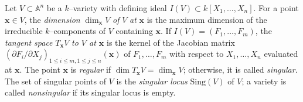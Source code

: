 \documentclass[pdflatex,sn-basic]{sn-jnl}%
\theoremstyle{thmstyleone}%
\theoremstyle{thmstyletwo}%
\theoremstyle{thmstylethree}%
\theoremstyle{definition}
\numberwithin{equation}{section}
\newcommand{\bfs}{\boldsymbol}
\newcommand{\A}{\mathbb A}
\newcommand{\Pp}{\mathbb P}
\begin{document}
%
%

Let $V\subset\A^n$ be a $k$--variety with defining ideal $I(V)\subset k[X_1,\ldots,
X_n]$. For a point $\bfs x\in V$, the {\em
dimension} $\dim_{\bfs x}V$ {\em of} $V$ {\em at} $\bfs x$ is the maximum
dimension of the irreducible $k$--components of $V$ containing
$\bfs x$. If $I(V)=(F_1,\ldots, F_m)$, the {\em tangent space} $T_{\bfs x}V$
{\em to $V$ at $\bfs x$} is the kernel of the Jacobian matrix $(\partial
F_i/\partial X_j)_{1\le i\le m,1\le j\le n}(\bfs x)$ of
$F_1,\ldots, F_m$ with respect to $X_1,\ldots, X_n$ evaluated
at $\bfs x$. %
%
%
The point $\bfs x$ is {\em regular} if $\dim T_{\bfs x}V=\dim_{\bfs x}V$; otherwise,
it is called {\em singular}. The set of singular points
of $V$ is the {\em singular locus} $\mathrm{Sing}(V)$ of $V$; a
variety is called {\em nonsingular} if its singular locus is empty.
%
%
\end{document}
